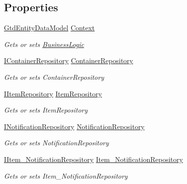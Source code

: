 \subsection*{Properties}
\begin{DoxyCompactItemize}
\item 
\mbox{\hyperlink{class_gtd_app_1_1_data_1_1_gtd_entity_data_model}{Gtd\+Entity\+Data\+Model}} \mbox{\hyperlink{class_gtd_app_1_1_logic_1_1_business_logic_a874b4e829adf02e8bbf80cdef657c81d}{Context}}
\begin{DoxyCompactList}\small\item\em Gets or sets \mbox{\hyperlink{class_gtd_app_1_1_logic_1_1_business_logic}{Business\+Logic}} \end{DoxyCompactList}\item 
\mbox{\hyperlink{interface_gtd_app_1_1_repository_1_1_interfaces_1_1_i_container_repository}{I\+Container\+Repository}} \mbox{\hyperlink{class_gtd_app_1_1_logic_1_1_business_logic_ace91111fd0843da6dc450eb0557437e2}{Container\+Repository}}
\begin{DoxyCompactList}\small\item\em Gets or sets Container\+Repository \end{DoxyCompactList}\item 
\mbox{\hyperlink{interface_gtd_app_1_1_repository_1_1_interfaces_1_1_i_item_repository}{I\+Item\+Repository}} \mbox{\hyperlink{class_gtd_app_1_1_logic_1_1_business_logic_a51c7cd556dc40e5e0618b4820f325bf7}{Item\+Repository}}
\begin{DoxyCompactList}\small\item\em Gets or sets Item\+Repository \end{DoxyCompactList}\item 
\mbox{\hyperlink{interface_gtd_app_1_1_repository_1_1_interfaces_1_1_i_notification_repository}{I\+Notification\+Repository}} \mbox{\hyperlink{class_gtd_app_1_1_logic_1_1_business_logic_ae714d48c3f6c70bffd5557237a441ca0}{Notification\+Repository}}
\begin{DoxyCompactList}\small\item\em Gets or sets Notification\+Repository \end{DoxyCompactList}\item 
\mbox{\hyperlink{interface_gtd_app_1_1_repository_1_1_interfaces_1_1_i_item___notification_repository}{I\+Item\+\_\+\+Notification\+Repository}} \mbox{\hyperlink{class_gtd_app_1_1_logic_1_1_business_logic_a1f6fdb6a8c3e4d590eb6c539abe4d24a}{Item\+\_\+\+Notification\+Repository}}
\begin{DoxyCompactList}\small\item\em Gets or sets Item\+\_\+\+Notification\+Repository \end{DoxyCompactList}\end{DoxyCompactItemize}


